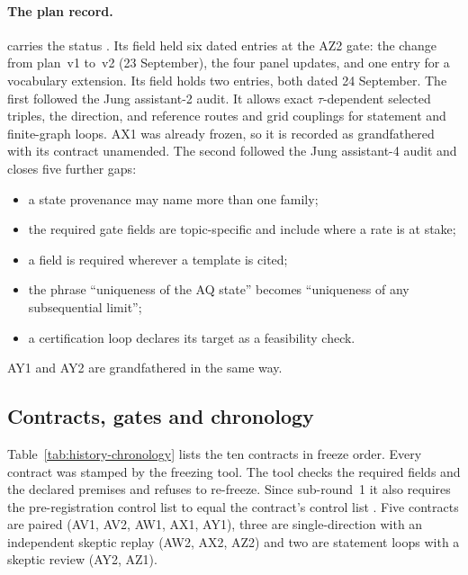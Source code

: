\paragraph{The plan record.}
 carries the status . Its
 field held six dated entries at the AZ2 gate: the change from plan~v1
to~v2 (23 September), the four panel updates, and one entry for a vocabulary
extension. Its  field holds
two entries, both dated 24 September. The first followed the Jung
assistant-2 audit. It allows exact $\tau$-dependent selected triples, the
 direction, and  reference routes and
grid couplings for statement and finite-graph loops. AX1 was already frozen,
so it is recorded as grandfathered with its contract unamended. The second
followed the Jung assistant-4 audit and closes five further gaps:
\begin{itemize}
\item a state provenance may name more than one family;
\item the required gate fields are topic-specific and include
 where a rate is at stake;
\item a  field is required wherever a
template is cited;
\item the phrase ``uniqueness of the AQ state'' becomes ``uniqueness of any
subsequential limit'';
\item a certification loop declares its target as a feasibility check.
\end{itemize}
AY1 and AY2 are grandfathered in the same way.

\subsection{Contracts, gates and chronology}
\label{sec:history-chronology}
Table~\ref{tab:history-chronology} lists the ten contracts in freeze order.
Every contract was stamped by the freezing tool. The tool checks the required
fields and the declared premises and refuses to re-freeze. Since sub-round~1
it also requires the pre-registration control list to equal the contract's
control list \cite{r32contracts}. Five contracts are paired (AV1, AV2, AW1, AX1, AY1),
three are single-direction with an independent skeptic replay (AW2, AX2, AZ2)
and two are statement loops with a skeptic review (AY2, AZ1).

